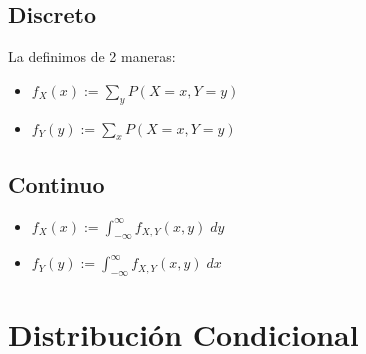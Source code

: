 \documentclass[12pt, fleqn]{report}                             %
\theoremstyle{break}                                            %
\newcommand{\inftyInt} {\int_{-\infty}^{\infty}}                %
\begin{document}
            \vspace{1em}
            \subsection{Discreto}

                La definimos de 2 maneras:
                \begin{itemize}
                    \item
                        $\displaystyle f_X(x) := \sum_y P(X = x, Y = y)$ 
                    \item
                        $\displaystyle f_Y(y) := \sum_x P(X = x, Y = y)$ 
                \end{itemize}


            \vspace{1em}
            \subsection{Continuo}

                \begin{itemize}
                    \item
                        $\displaystyle f_X(x) := \inftyInt f_{X, Y}(x, y) \; dy$ 
                    \item
                        $\displaystyle f_Y(y) := \inftyInt f_{X, Y}(x, y) \; dx$ 
                \end{itemize}


        \clearpage
        \section{Distribución Condicional}

\end{document}
